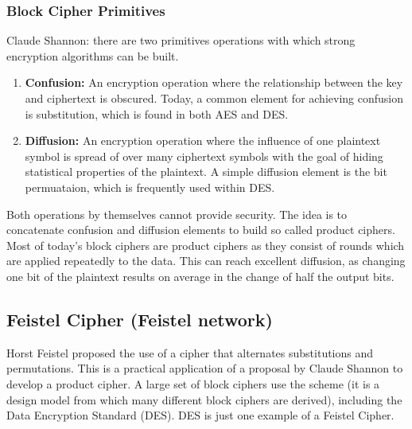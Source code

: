 \documentclass{math}
\begin{document}
\subsubsection*{Block Cipher Primitives}
Claude Shannon: there are two primitives operations with which strong encryption
algorithms can be built.
\begin{enumerate}
  \item \textbf{Confusion:} An encryption operation where the relationship
  between the key and ciphertext is obscured. Today, a common element for
  achieving confusion is substitution, which is found in both AES and DES.
  \item \textbf{Diffusion:} An encryption operation where the influence of one
  plaintext symbol is spread of over many ciphertext symbols with the goal of
  hiding statistical properties of the plaintext. A simple diffusion element is
  the bit permuataion, which is frequently used within DES.
\end{enumerate}
Both operations by themselves cannot provide security. The idea is to
concatenate confusion and diffusion elements to build so called product ciphers.
Most of today's block ciphers are product ciphers as they consist of rounds
which are applied repeatedly to the data. This can reach excellent diffusion, as
changing one bit of the plaintext results on average in the change of half the
output bits.

\subsection*{Feistel Cipher (Feistel network)}
Horst Feistel proposed the use of a cipher that alternates substitutions and
permutations. This is a practical application of a proposal by Claude Shannon to
develop a product cipher. A large set of block ciphers use the scheme (it is a
design model from which many different block ciphers are derived), including the
Data Encryption Standard (DES). DES is just one example of a Feistel Cipher.
\end{document}
